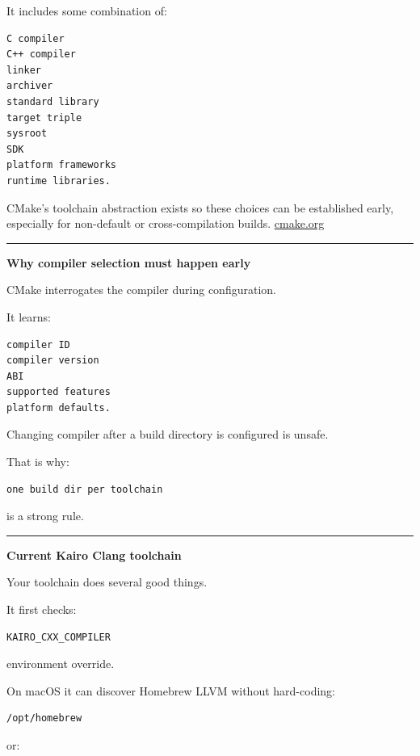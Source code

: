It includes some combination of:

\begin{verbatim}
C compiler
C++ compiler
linker
archiver
standard library
target triple
sysroot
SDK
platform frameworks
runtime libraries.
\end{verbatim}

CMake's toolchain abstraction exists so these choices can be established early, especially for non-default or cross-compilation builds. \href{https://cmake.org/cmake/help/latest/manual/cmake-toolchains.7.html?highlight=toolchains&utm_source=chatgpt.com}{cmake.org}

\begin{center}\rule{0.5\linewidth}{0.5pt}\end{center}

\textbf{Why compiler selection must happen early}

CMake interrogates the compiler during configuration.

It learns:

\begin{verbatim}
compiler ID
compiler version
ABI
supported features
platform defaults.
\end{verbatim}

Changing compiler after a build directory is configured is unsafe.

That is why:

\begin{verbatim}
one build dir per toolchain
\end{verbatim}

is a strong rule.

\begin{center}\rule{0.5\linewidth}{0.5pt}\end{center}

\textbf{Current Kairo Clang toolchain}

Your toolchain does several good things.

It first checks:

\begin{verbatim}
KAIRO_CXX_COMPILER
\end{verbatim}

environment override.

On macOS it can discover Homebrew LLVM without hard-coding:

\begin{verbatim}
/opt/homebrew
\end{verbatim}

or:

